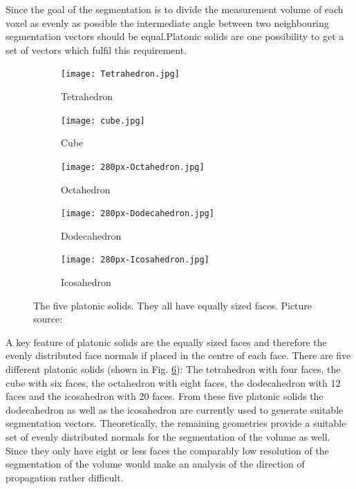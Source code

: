 Since the goal of the segmentation is to divide the measurement volume of each voxel as evenly as possible the intermediate angle between two neighbouring segmentation vectors should be equal.Platonic solids are one possibility to get a set of vectors which fulfil this requirement.
\begin{figure}[H]
     \centering
     \begin{subfigure}[b]{0.19\textwidth}
         \centering
        \texttt{[image: Tetrahedron.jpg]}
         \caption{Tetrahedron}
         \label{fig:Tetrahedron}
     \end{subfigure}
     \hfill
     \begin{subfigure}[b]{0.19\textwidth}
         \centering
         \texttt{[image: cube.jpg]}
         \caption{Cube}
         \label{fig:cube}
     \end{subfigure}
     \hfill
     \begin{subfigure}[b]{0.19\textwidth}
         \centering
         \texttt{[image: 280px-Octahedron.jpg]}
         \caption{Octahedron}
         \label{fig:Octahedron}
     \end{subfigure}
     \hfill
     \begin{subfigure}[b]{0.19\textwidth}
         \centering
         \texttt{[image: 280px-Dodecahedron.jpg]}
         \caption{Dodecahedron}
         \label{fig:Dodecahedron}
     \end{subfigure}
     \hfill
     \begin{subfigure}[b]{0.19\textwidth}
         \centering
         \texttt{[image: 280px-Icosahedron.jpg]}
         \caption{Icosahedron}
         \label{fig:Icosahedro}
     \end{subfigure}
        \caption{The five platonic solids. They all have equally sized faces. Picture source: \cite{wiki_platonic}}
        \label{fig:platonic_solids}
\end{figure}

A key feature of platonic solids are the equally sized faces and therefore the evenly distributed face normals if placed in the centre of each face.
There are five different platonic solids (shown in Fig. \ref{fig:platonic_solids}): The tetrahedron with four faces, the cube with six faces, the octahedron with eight faces, the dodecahedron with 12 faces and the icosahedron with 20 faces.
From these five platonic solids the dodecahedron as well as the icosahedron are currently used to generate suitable segmentation vectors. Theoretically, the remaining geometries provide a suitable set of evenly distributed normals for the segmentation of the volume as well. Since they only have eight or less faces the comparably low resolution of the segmentation of the volume would make an analysis of the direction of propagation rather difficult.

